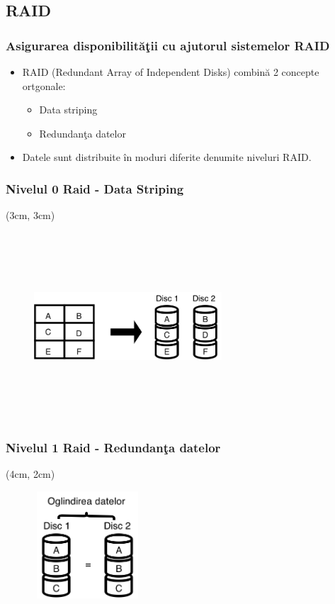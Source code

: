 \documentclass{beamer}
\theoremstyle{definition}
\begin{document}
\subsection{RAID}
\begin{frame}
    \frametitle{Asigurarea disponibilit\u{a}\c{t}ii cu ajutorul sistemelor RAID}
    \begin{itemize}
        \item RAID (Redundant Array of Independent Disks) combin\u{a} 2 concepte ortgonale:
        \pause
            \begin{itemize}
                \item Data striping
                \pause
                \item Redundan\c{t}a datelor 
            \end{itemize}
        \pause
        \item Datele sunt distribuite \^{i}n moduri diferite denumite niveluri RAID.
    \end{itemize}
\end{frame}
\begin{frame}
    \frametitle{Nivelul 0 Raid - Data Striping}
    \begin{textblock*}{4cm}(3cm, 3cm)
        \begin{figure}
            \includegraphics[width=7cm,height=7cm,keepaspectratio]{img/raid/raid0.png}
       \end{figure}
    \end{textblock*}  
\end{frame}

\begin{frame}
    \frametitle{Nivelul 1 Raid - Redundan\c{t}a datelor}
    \begin{textblock*}{4cm}(4cm, 2cm)
        \begin{figure}
            \includegraphics[width=4cm,height=4cm,keepaspectratio]{img/raid/raid1.png}

            \caption{}
       \end{figure}
    \end{textblock*}  
\end{frame}
\end{document}
